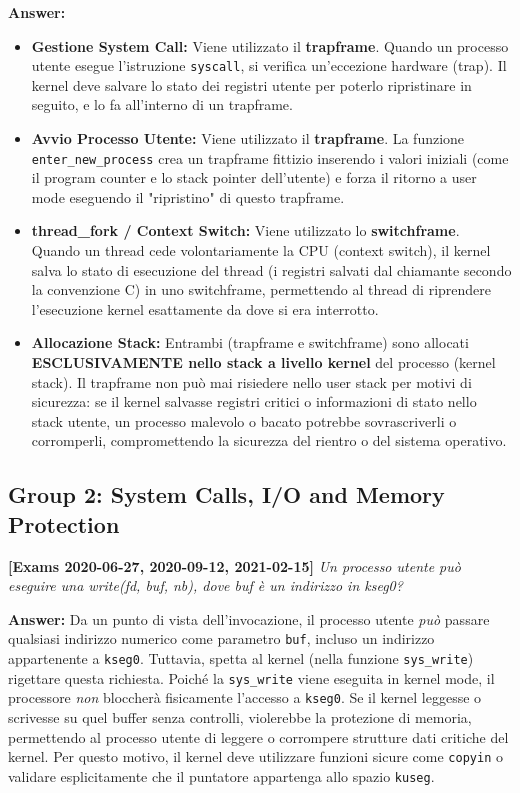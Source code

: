 \textbf{Answer:}
\begin{itemize}
    \item \textbf{Gestione System Call:} Viene utilizzato il \textbf{trapframe}. Quando un processo utente esegue l'istruzione \texttt{syscall}, si verifica un'eccezione hardware (trap). Il kernel deve salvare lo stato dei registri utente per poterlo ripristinare in seguito, e lo fa all'interno di un trapframe.
    \item \textbf{Avvio Processo Utente:} Viene utilizzato il \textbf{trapframe}. La funzione \texttt{enter\_new\_process} crea un trapframe fittizio inserendo i valori iniziali (come il program counter e lo stack pointer dell'utente) e forza il ritorno a user mode eseguendo il "ripristino" di questo trapframe.
    \item \textbf{thread\_fork / Context Switch:} Viene utilizzato lo \textbf{switchframe}. Quando un thread cede volontariamente la CPU (context switch), il kernel salva lo stato di esecuzione del thread (i registri salvati dal chiamante secondo la convenzione C) in uno switchframe, permettendo al thread di riprendere l'esecuzione kernel esattamente da dove si era interrotto.
    \item \textbf{Allocazione Stack:} Entrambi (trapframe e switchframe) sono allocati \textbf{ESCLUSIVAMENTE nello stack a livello kernel} del processo (kernel stack). Il trapframe non può mai risiedere nello user stack per motivi di sicurezza: se il kernel salvasse registri critici o informazioni di stato nello stack utente, un processo malevolo o bacato potrebbe sovrascriverli o corromperli, compromettendo la sicurezza del rientro o del sistema operativo.
\end{itemize}

\newpage
\subsection*{Group 2: System Calls, I/O and Memory Protection}

\textbf{[Exams 2020-06-27, 2020-09-12, 2021-02-15]}
\textit{Un processo utente può eseguire una write(fd, buf, nb), dove buf è un indirizzo in kseg0?}

\textbf{Answer:}
Da un punto di vista dell'invocazione, il processo utente \textit{può} passare qualsiasi indirizzo numerico come parametro \texttt{buf}, incluso un indirizzo appartenente a \texttt{kseg0}. Tuttavia, spetta al kernel (nella funzione \texttt{sys\_write}) rigettare questa richiesta. Poiché la \texttt{sys\_write} viene eseguita in kernel mode, il processore \textit{non} bloccherà fisicamente l'accesso a \texttt{kseg0}. Se il kernel leggesse o scrivesse su quel buffer senza controlli, violerebbe la protezione di memoria, permettendo al processo utente di leggere o corrompere strutture dati critiche del kernel. Per questo motivo, il kernel deve utilizzare funzioni sicure come \texttt{copyin} o validare esplicitamente che il puntatore appartenga allo spazio \texttt{kuseg}.

